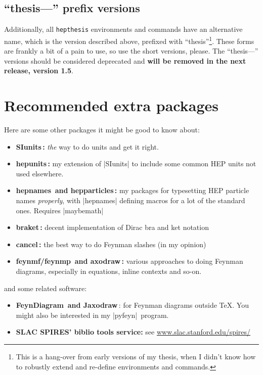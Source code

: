 \documentclass[12pt]{scrartcl}
\newcommand{\hepthesis}{\texttt{hepthesis}\xspace}
\begin{document}
\subsection{``thesis---'' prefix versions}
Additionally, all \hepthesis environments and commands have an alternative name,
which is the version described above, prefixed with ``thesis''\footnote{This
  is a hang-over from early versions of my thesis, when I didn't know how to
  robustly extend and re-define environments and commands.}. These forms are
frankly a bit of a pain to use, so use the short versions, please. The
``thesis---'' versions should be considered deprecated and \textbf{will be removed
in the next release, version 1.5}.


\section{Recommended extra packages}
\label{sec:ExtraPackages}
Here are some other packages it might be good to know about:
\begin{itemize}
\item \textbf{SIunits\,\cite{SIunits}:} \emph{the} way to do units and get it right.
\item \textbf{hepunits\,\cite{hepunits}:} my extension of |SIunits| to include some common HEP units not used elsewhere.
\item \textbf{hepnames\,\cite{hepnames} and hepparticles\,\cite{hepparticles}:} my packages for typesetting HEP particle names \emph{properly}, with |hepnames| defining macros for a lot of the standard ones. Requires |maybemath|\,\cite{maybemath}
\item \textbf{braket\,\cite{braket}:} decent implementation of Dirac bra and ket notation
\item \textbf{cancel\,\cite{cancel}:} the best way to do Feynman slashes (in my opinion)
\item \textbf{feynmf/feynmp\,\cite{feynmf} and axodraw\,\cite{axodraw}:} various approaches to doing Feynman diagrams, especially in equations, inline contexts and so-on.
\end{itemize}
%
and some related software:
%
\begin{itemize}
\item \textbf{FeynDiagram\,\cite{feyndiagram} and Jaxodraw\,\cite{jaxodraw}}: for Feynman diagrams outside \TeX. You might also
  be interested in my |pyfeyn|\,\cite{pyfeyn} program.
\item \textbf{SLAC SPIRES' biblio tools service:} see \url{www.slac.stanford.edu/spires/}
\end{itemize}
\end{document}
